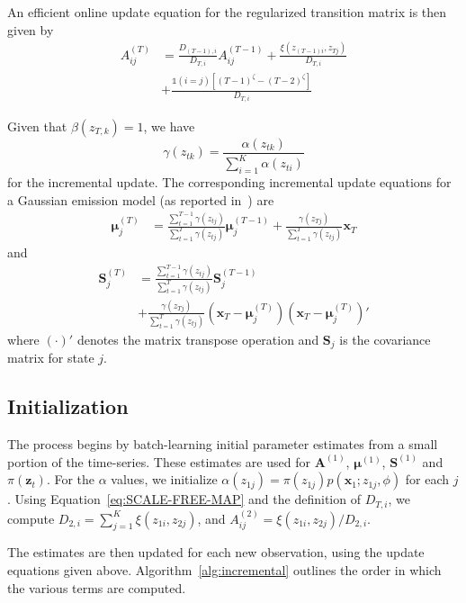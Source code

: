 \documentclass{article}
\begin{document}
An efficient online update equation for the regularized transition matrix is then given by
\begin{align*}
    A_{ij}^{(T)} &= \frac{D_{(T-1), i}}{D_{T,i}}A_{ij}^{(T-1)}
    + \frac{\xi(z_{(T-1)i}, z_{Tj})}{D_{T,i}} \\
                 &+ \frac{\mathds{1}(i = j)[(T-1)^\zeta - (T-2)^\zeta]}{D_{T,i}}
\end{align*}

Given that $\beta(z_{T,k}) = 1$, we have 
\[
    \gamma(z_{tk}) = \frac{\alpha(z_{tk})}{\sum_{i=1}^{K}\alpha(z_{ti})}
\]
for the incremental update. The corresponding incremental update equations for a Gaussian emission model (as reported in~\cite{stenger2001}) are 
\begin{align*}
    \mathbf{\mu}_{j}^{(T)} &= \frac{\sum_{t=1}^{T-1}\gamma(z_{tj})}{\sum_{t=1}^{T}\gamma(z_{tj})}\mathbf{\mu}_{j}^{(T-1)} + \frac{\gamma(z_{Tj})}{\sum_{t=1}^{T}\gamma(z_{tj})}\mathbf{x}_T
\end{align*}
and
\begin{align*}
    \mathbf{S}_j^{(T)} &= \frac{\sum_{t=1}^{T-1}\gamma(z_{tj})}{\sum_{t=1}^{T}\gamma(z_{tj})}\mathbf{S}_j^{(T-1)} \\
                       &+ \frac{\gamma(z_{Tj})}{\sum_{t=1}^{T}\gamma(z_{tj})}\left(\mathbf{x}_T - \mathbf{\mu}_j^{(T)}\right)\left(\mathbf{x}_T - \mathbf{\mu}_j^{(T)}\right)'
\end{align*}
where $(\cdot)'$ denotes the matrix transpose operation and $\mathbf{S}_j$ is the covariance matrix for state $j$.

\subsection{Initialization}

The process begins by batch-learning initial parameter estimates from a small
portion of the time-series. These estimates are used for $\mathbf{A}^{(1)}$,
$\mathbf{\mu}^{(1)}$, $\mathbf{S}^{(1)}$ and $\pi(\mathbf{z}_t)$. For the
$\alpha$ values, we initialize $\alpha(z_{1j}) = \pi(z_{1j})p(\mathbf{x}_1;z_{1j}, 
\phi)$ for each $j$. Using Equation~\ref{eq:SCALE-FREE-MAP} and the definition
of $D_{T,i}$, we compute $D_{2,i} = \sum_{j=1}^{K} \xi(z_{1i}, z_{2j})$, and 
$A_{ij}^{(2)} = \xi(z_{1i}, z_{2j})/D_{2,i}$. 

The estimates are then updated for each new observation, using the update equations given above. Algorithm~\ref{alg:incremental} outlines the order in which the various terms are computed.
\end{document}
